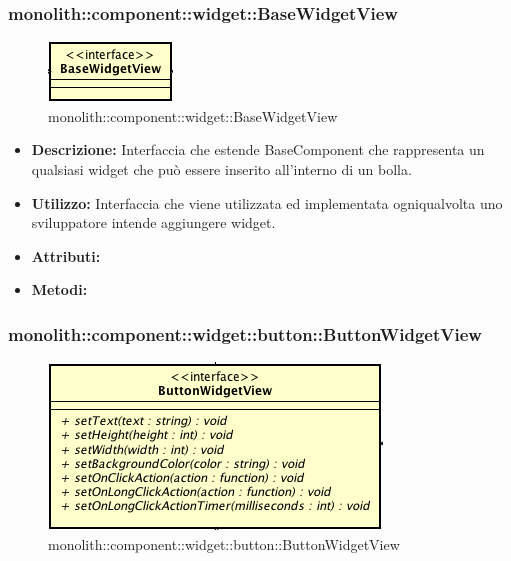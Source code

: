 \subsubsection{monolith::component::widget::BaseWidgetView}

\label{monolith::component::widget::BaseWidgetView}
\begin{figure}[ht]
	\centering
	\includegraphics[scale=0.5]{Sezioni/SottosezioniST/img/BaseWidgetView.png}
	\caption{monolith::component::widget::BaseWidgetView}
\end{figure}

\begin{itemize}
\item \textbf{Descrizione:} Interfaccia che estende BaseComponent che rappresenta un qualsiasi widget che può essere inserito all'interno di un bolla.
\item \textbf{Utilizzo:} Interfaccia che viene utilizzata ed implementata ogniqualvolta uno sviluppatore intende aggiungere widget.
\item \textbf{Attributi:}
\item \textbf{Metodi:}
\end{itemize}

\subsubsection{monolith::component::widget::button::ButtonWidgetView}

\label{monolith::component::widget::button::ButtonWidgetView}
\begin{figure}[ht]
	\centering
	\includegraphics[scale=0.5]{Sezioni/SottosezioniST/img/ButtonWidgetView.png}
	\caption{monolith::component::widget::button::ButtonWidgetView}
\end{figure}

